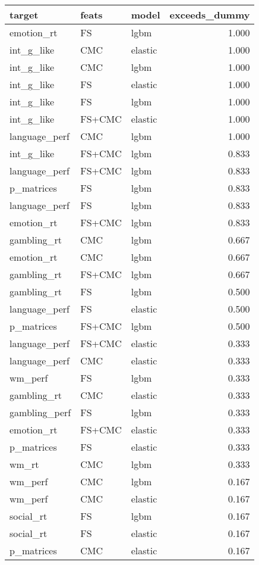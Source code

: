 \documentclass{article}
\begin{document}
\begin{table}
\centering
\begin{tabular}{lllr}
\toprule
target & feats & model & exceeds\_dummy \\
\midrule
emotion\_rt & FS & lgbm & 1.000 \\
int\_g\_like & CMC & elastic & 1.000 \\
int\_g\_like & CMC & lgbm & 1.000 \\
int\_g\_like & FS & elastic & 1.000 \\
int\_g\_like & FS & lgbm & 1.000 \\
int\_g\_like & FS+CMC & elastic & 1.000 \\
language\_perf & CMC & lgbm & 1.000 \\
int\_g\_like & FS+CMC & lgbm & 0.833 \\
language\_perf & FS+CMC & lgbm & 0.833 \\
p\_matrices & FS & lgbm & 0.833 \\
language\_perf & FS & lgbm & 0.833 \\
emotion\_rt & FS+CMC & lgbm & 0.833 \\
gambling\_rt & CMC & lgbm & 0.667 \\
emotion\_rt & CMC & lgbm & 0.667 \\
gambling\_rt & FS+CMC & lgbm & 0.667 \\
gambling\_rt & FS & lgbm & 0.500 \\
language\_perf & FS & elastic & 0.500 \\
p\_matrices & FS+CMC & lgbm & 0.500 \\
language\_perf & FS+CMC & elastic & 0.333 \\
language\_perf & CMC & elastic & 0.333 \\
wm\_perf & FS & lgbm & 0.333 \\
gambling\_rt & CMC & elastic & 0.333 \\
gambling\_perf & FS & lgbm & 0.333 \\
emotion\_rt & FS+CMC & elastic & 0.333 \\
p\_matrices & FS & elastic & 0.333 \\
wm\_rt & CMC & lgbm & 0.333 \\
wm\_perf & CMC & lgbm & 0.167 \\
wm\_perf & CMC & elastic & 0.167 \\
social\_rt & FS & lgbm & 0.167 \\
social\_rt & FS & elastic & 0.167 \\
p\_matrices & CMC & elastic & 0.167 \\

\end{tabular}
\end{table}
\end{document}
